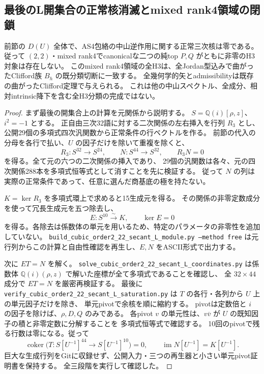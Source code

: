 \subsection{最後のL開集合の正常核消滅とmixed rank4領域の閉鎖}
\label{subsec:h3-order2-22-L-complete}
\begin{theorem}\label{thm:h3-order2-22-L-complete}
前節の $D(U)$ 全体で、AS4包絡の中山逆作用に関する正常三次核は零である。
従って $(2,2)$・mixed rank4でcanonicalな二つの純top $P,Q$ がともに非零のH3対象は存在しない。
このmixed rank4領域の全H3は、全Jordan型込みで曲がったClifford族 $B_h$ の既分類切断に一致する。
全幾何学的矢とadmissibilityは既存の曲がったClifford定理で与えられる。
これは他の中山スペクトル、全成分、相対intrinsic降下を含む全H3分類の完成ではない。
\end{theorem}
\begin{proof}
まず最後の開集合上の計算を元関係から説明する。
$S=\mathbb Q(i)[\rho,z]$、$i^2=-1$ とする。
正自由三次32語に対する二次関係の左右挿入を行列 $R_3$ とし、
公開29個の多項式四次汎関数から正常条件の行ベクトルを作る。
前節の代入の分母を各行で払い、$U$ の因子だけを除いて重複を除くと、
\[
 R_3:S^{32}\longrightarrow S^{24},\qquad N:S^{44}\longrightarrow S^{32},
 \qquad R_3N=0
\]
を得る。全て元の六つの二次関係の挿入であり、
29個の汎関数は各々、元の四次関係288本を多項式恒等式として消すことを先に検証する。
従って $N$ の列は実際の正常条件であって、任意に選んだ商基底の極を持たない。

$K=\ker R_3$ を多項式環上で求めると15生成元を得る。
その関係の非零定数成分を使って冗長生成元を五つ除去し、
\[
 E:S^{10}\xrightarrow{\sim}K,\qquad\ker E=0
\]
を得る。各除去は係数体の単元を用いるため、特定のパラメータの非零性を追加していない。
\texttt{build\_cubic\_order2\_22\_secant\_L\_module.py --method free}
は元行列からこの計算と自由性確認を再生し、$E,N$ をASCII形式で出力する。

次に $ET=N$ を解く。
\texttt{solve\_cubic\_order2\_22\_secant\_L\_coordinates.py}
は係数体 $\mathbb Q(i)(\rho,z)$ で解いた座標が全て多項式であることを確認し、
全 $32\times44$ 成分で $ET=N$ を厳密再検証する。
最後に \texttt{verify\_cubic\_order2\_22\_secant\_L\_saturation.py}
は $T$ の各行・各列から $U$ 上の単元因子だけを除き、
単元pivotで余核を順に縮約する。
pivotは定数倍と $i$ の因子を除けば、$\rho,D,Q$ のみである。
各pivot $v$ の単元性は、$v\overline v$ が $U$ の既知因子の積と非零定数に分解することを
多項式恒等式で確認する。
10回のpivotで残る行数は零になる。従って
\[
 \operatorname{coker}\bigl(T:S[U^{-1}]^{44}\to S[U^{-1}]^{10}\bigr)=0,
 \qquad \operatorname{im}N[U^{-1}]=K[U^{-1}].
\]
巨大な生成行列をGitに収録せず、公開入力・三つの再生器と小さい単元pivot証明書を保持する。
全三段階を実行して確認した。


\end{proof}
